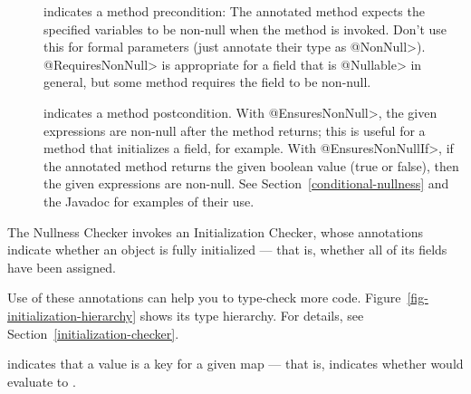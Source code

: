 \begin{description}

\item[]
  indicates a method precondition:  The annotated method expects the
  specified variables to be non-null when the
  method is invoked.  Don't use this for formal parameters (just annotate
  their type as \<@NonNull>).  \<@RequiresNonNull> is appropriate for
  a field that is \<@Nullable> in general, but some method requires the
  field to be non-null.

\item[]
\item[]
  indicates a method postcondition.  With \<@EnsuresNonNull>, the given
  expressions are non-null after the method returns; this is useful for a
  method that initializes a field, for example.  With
  \<@EnsuresNonNullIf>, if the annotated
  method returns the given boolean value (true or false), then the given
  expressions are non-null.  See Section~\ref{conditional-nullness} and the
  Javadoc for examples of their use.

\end{description}



The Nullness Checker invokes an Initialization Checker, whose annotations indicate whether
an object is fully initialized --- that is, whether all of its fields have
been assigned.

\begin{description}
\item[]
\item[]
\item[]
\end{description}

\noindent
Use of these annotations can help you to type-check more
code.  Figure~\ref{fig-initialization-hierarchy} shows its type hierarchy.  For
details, see Section~\ref{initialization-checker}.



\begin{description}
\item[]
\end{description}
    indicates that a value is a key for a given map --- that is, indicates
    whether  would evaluate to .

